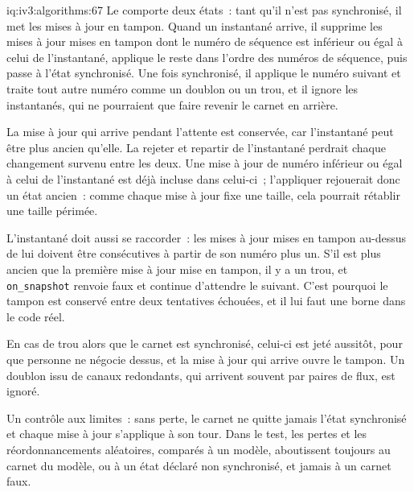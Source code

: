 \begin{solution}{iq:iv3:algorithms:67}
Le  comporte deux états~: tant qu'il n'est pas synchronisé, il met les mises à jour en tampon. Quand un instantané arrive, il supprime les mises à jour mises en tampon dont le numéro de séquence est inférieur ou égal à celui de l'instantané, applique le reste dans l'ordre des numéros de séquence, puis passe à l'état synchronisé. Une fois synchronisé, il applique le numéro suivant et traite tout autre numéro comme un doublon ou un trou, et il ignore les instantanés, qui ne pourraient que faire revenir le carnet en arrière.
\label{lst:iv3:al:snapshot}

La mise à jour qui arrive pendant l'attente est conservée, car l'instantané peut être plus ancien qu'elle. La rejeter et repartir de l'instantané perdrait chaque changement survenu entre les deux. Une mise à jour de numéro inférieur ou égal à celui de l'instantané est déjà incluse dans celui-ci~; l'appliquer rejouerait donc un état ancien~: comme chaque mise à jour fixe une taille, cela pourrait rétablir une taille périmée.

L'instantané doit aussi se raccorder~: les mises à jour mises en tampon au-dessus de lui doivent être consécutives à partir de son numéro plus un. S'il est plus ancien que la première mise à jour mise en tampon, il y a un trou, et \texttt{on\_snapshot} renvoie faux et continue d'attendre le suivant. C'est pourquoi le tampon est conservé entre deux tentatives échouées, et il lui faut une borne dans le code réel.

En cas de trou alors que le carnet est synchronisé, celui-ci est jeté aussitôt, pour que personne ne négocie dessus, et la mise à jour qui arrive ouvre le tampon. Un doublon issu de canaux redondants, qui arrivent souvent par paires de flux, est ignoré.

Un contrôle aux limites~: sans perte, le carnet ne quitte jamais l'état synchronisé et chaque mise à jour s'applique à son tour. Dans le test, les pertes et les réordonnancements aléatoires, comparés à un modèle, aboutissent toujours au carnet du modèle, ou à un état déclaré non synchronisé, et jamais à un carnet faux.

\end{solution}

